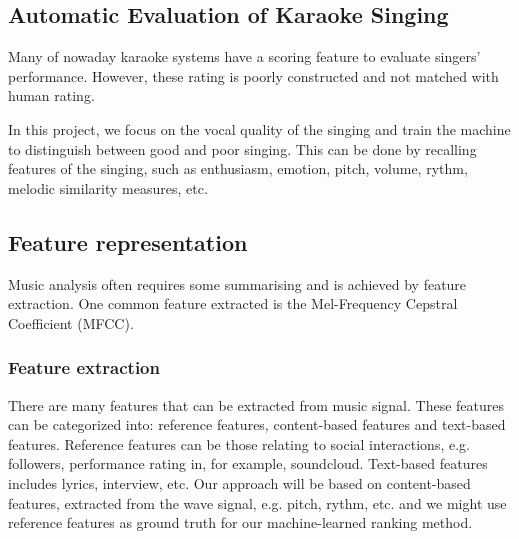 \documentclass[paper=a4, fontsize=11pt]{scrartcl}
\begin{document}
\subsection{Automatic Evaluation of Karaoke Singing}
Many of nowaday karaoke systems have a scoring feature to evaluate singers' performance. However, these rating is poorly constructed and not matched with human rating. 

In this project, we focus on the vocal quality of the singing and train the machine to distinguish between good and poor singing. This can be done by recalling features of the singing, such as enthusiasm, emotion, pitch, volume, rythm, melodic similarity measures, etc.

\subsection{Feature representation}
Music analysis often requires some summarising and is achieved by feature extraction. One common feature extracted is the Mel-Frequency Cepstral Coefficient (MFCC).

\subsubsection{Feature extraction}


There are many features that can be extracted from music signal. These features can be categorized into: reference features, content-based features and text-based features. Reference features can be those relating to social interactions, e.g. followers, performance rating in, for example, soundcloud. Text-based features includes lyrics, interview, etc. Our approach will be based on content-based features, extracted from the wave signal, e.g. pitch, rythm, etc. and we might use reference features as ground truth for our machine-learned ranking method.
\end{document}
